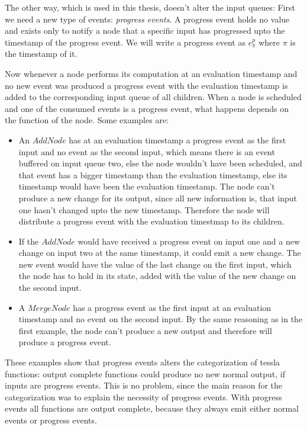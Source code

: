 The other way, which is used in this thesis, doesn't alter the input queues:
First we need a new type of events: \emph{progress events}.
A progress event holds no value and exists only to notify a node that a specific input has progressed upto the timestamp of the progress event.
We will write a progress event as \(e^p_\pi\) where \(\pi\) is the timestamp of it.

Now whenever a node performs its computation at an evaluation timestamp and no new event was produced a progress event with the evaluation timestamp is added to the corresponding input queue of all children.
When a node is scheduled and one of the consumed events is a progress event, what happens depends on the function of the node. Some examples are:

\begin{itemize}
  \item An \(\mathit{AddNode}\) has at an evaluation timestamp a progress event as the first input and no event as the second input, which means there is an event buffered on input queue two, else the node wouldn't have been scheduled, and that event has a bigger timestamp than the evaluation timestamp, else its timestamp would have been the evaluation timestamp. The node can't produce a new change for its output, since all new information is, that input one hasn't changed upto the new timestamp. Therefore the node will distribute a progress event with the evaluation timestmap to its children.
  \item If the \(\mathit{AddNode}\) would have received a progress event on input one and a new change on input two at the same timestamp, it could emit a new change. The new event would have the value of the last change on the first input, which the node has to hold in its state, added with the value of the new change on the second input.
  \item A \(\mathit{MergeNode}\) has a progress event as the first input at an evaluation timestamp and no event on the second input. By the same reasoning as in the first example, the node can't produce a new output and therefore will produce a progress event.
\end{itemize}

These examples show that progress events alters the categorization of \gls{tessla} functions: output complete functions could produce no new normal output, if inputs are progress events.
This is no problem, since the main reason for the categorization was to explain the necessity of progress events.
With progress events all functions are output complete, because they always emit either normal events or progress events.

